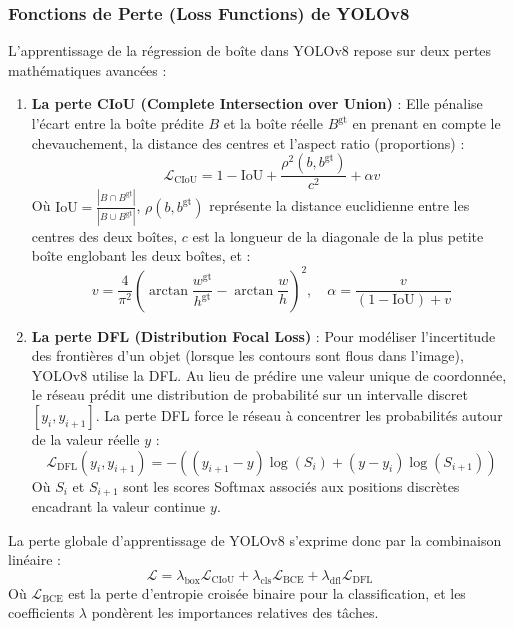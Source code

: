 \documentclass[12pt,a4paper]{article}
\begin{document}
\subsubsection{Fonctions de Perte (Loss Functions) de YOLOv8}
L'apprentissage de la régression de boîte dans YOLOv8 repose sur deux pertes mathématiques avancées :
\begin{enumerate}
  \item \textbf{La perte CIoU (Complete Intersection over Union)} \cite{Zheng2020CIoU} : Elle pénalise l'écart entre la boîte prédite $B$ et la boîte réelle $B^{\text{gt}}$ en prenant en compte le chevauchement, la distance des centres et l'aspect ratio (proportions) :
  \begin{equation}
    \mathcal{L}_{\text{CIoU}} = 1 - \text{IoU} + \frac{\rho^2(b, b^{\text{gt}})}{c^2} + \alpha v
  \end{equation}
  Où $\text{IoU} = \frac{|B \cap B^{\text{gt}}|}{|B \cup B^{\text{gt}}|}$, $\rho(b, b^{\text{gt}})$ représente la distance euclidienne entre les centres des deux boîtes, $c$ est la longueur de la diagonale de la plus petite boîte englobant les deux boîtes, et :
  \begin{equation}
    v = \frac{4}{\pi^2} \left( \arctan \frac{w^{\text{gt}}}{h^{\text{gt}}} - \arctan \frac{w}{h} \right)^2, \quad \alpha = \frac{v}{(1 - \text{IoU}) + v}
  \end{equation}
  
  \item \textbf{La perte DFL (Distribution Focal Loss)} \cite{Li2020DFL} : Pour modéliser l'incertitude des frontières d'un objet (lorsque les contours sont flous dans l'image), YOLOv8 utilise la DFL. Au lieu de prédire une valeur unique de coordonnée, le réseau prédit une distribution de probabilité sur un intervalle discret $[y_i, y_{i+1}]$. La perte DFL force le réseau à concentrer les probabilités autour de la valeur réelle $y$ :
  \begin{equation}
    \mathcal{L}_{\text{DFL}}(y_i, y_{i+1}) = - \left( (y_{i+1} - y)\log(S_i) + (y - y_i)\log(S_{i+1}) \right)
  \end{equation}
  Où $S_i$ et $S_{i+1}$ sont les scores Softmax associés aux positions discrètes encadrant la valeur continue $y$.
\end{enumerate}

La perte globale d'apprentissage de YOLOv8 s'exprime donc par la combinaison linéaire :
\begin{equation}
  \mathcal{L} = \lambda_{\text{box}} \mathcal{L}_{\text{CIoU}} + \lambda_{\text{cls}} \mathcal{L}_{\text{BCE}} + \lambda_{\text{dfl}} \mathcal{L}_{\text{DFL}}
\end{equation}
Où $\mathcal{L}_{\text{BCE}}$ est la perte d'entropie croisée binaire pour la classification, et les coefficients $\lambda$ pondèrent les importances relatives des tâches.
\end{document}
